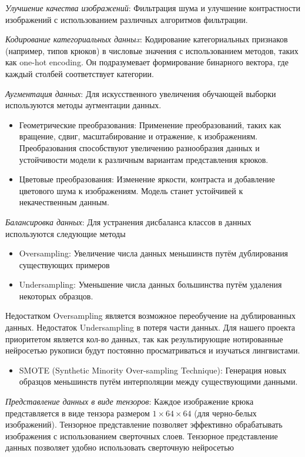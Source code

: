 	\textit{Улучшение качества изображений}: Фильтрация шума и улучшение контрастности изображений с 
		использованием различных алгоритмов фильтрации.

	\textit{Кодирование категориальных данныx}: Кодирование категориальных признаков (например, типов крюков) 
		в числовые значения с использованием методов, таких как one-hot encoding. Он подразумевает формирование
		бинарного вектора, где каждый столбей соответствует категории.

	\textit{Аугментация данных}: Для искусственного увеличения обучающей выборки используются методы аугментации данных.
		\begin{itemize}
			\item Геометрические преобразования: Применение преобразований, таких как вращение, сдвиг, масштабирование и отражение, к изображениям.
				Преобразования способствуют увеличению разнообразия данных и устойчивости модели к различным вариантам представления крюков.
			\item Цветовые преобразования: Изменение яркости, контраста и добавление цветового шума к изображениям. 
				Модель станет устойчивей к некачественным данным.
		\end{itemize}
	
	\textit{Балансировка данных}: Для устранения дисбаланса классов в данных используются следующие методы
		\begin{itemize}
			\item Oversampling: Увеличение числа данных меньшинств путём дублирования существующих примеров
			\item Undersampling: Уменьшение числа данных большинства путём удаления некоторых образцов.
		\end{itemize}
		Недостатком Oversampling является возможное переобучение на дублированных данных. Недостаток Undersampling
		в потеря части данных. Для нашего проекта приоритетом является кол-во данных, так как результирующие
		нотированные нейросетью рукописи будут постоянно просматриваться и изучаться лингвистами.
		\begin{itemize}
			\item SMOTE (Synthetic Minority Over-sampling Technique): Генерация новых образцов меньшинств путём 
				интерполяции между существующими данными.
		\end{itemize}

	\textit{Представление данных в виде тензоров}: 
		Каждое изображение крюка представляется в виде тензора размером \(1 \times 64 \times 64\) (для черно-белых изображений). 
		Тензорное представление позволяет эффективно обрабатывать изображения с использованием сверточных слоев. Тензорное представление
		данных позволяет удобно использовать сверточную нейросетью
	
